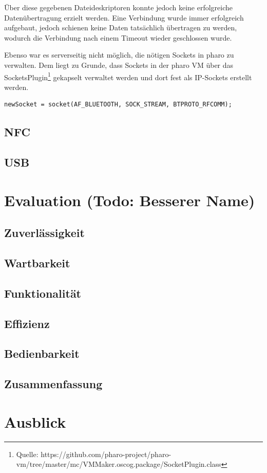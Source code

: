 \documentclass[12pt,a4paper]{article}
\begin{document}
        Über diese gegebenen Dateideskriptoren konnte jedoch keine erfolgreiche Datenübertragung erzielt werden. Eine Verbindung wurde immer erfolgreich aufgebaut, jedoch schienen keine Daten tatsächlich übertragen zu werden, wodurch die Verbindung nach einem Timeout wieder geschlossen wurde.
        
        Ebenso war es serverseitig nicht möglich, die nötigen Sockets in pharo zu verwalten. Dem liegt zu Grunde, dass Sockets in der pharo VM über das SocketsPlugin\footnote{Quelle: https://github.com/pharo-project/pharo-vm/tree/master/mc/VMMaker.oscog.package/SocketPlugin.class} gekapselt verwaltet werden und dort fest als IP-Sockets erstellt werden.
        \begin{lstlisting}
newSocket = socket(AF_BLUETOOTH, SOCK_STREAM, BTPROTO_RFCOMM);

        \end{lstlisting}
    \subsection{NFC}
		
		\subsection{USB}
		
		\section{Evaluation (Todo: Besserer Name)}
		
		\subsection{Zuverlässigkeit}
		
		\subsection{Wartbarkeit}
		
		\subsection{Funktionalität}
		
		\subsection{Effizienz}
		
		\subsection{Bedienbarkeit}
		
		\subsection{Zusammenfassung}
		
		\section{Ausblick}		
\end{document}
